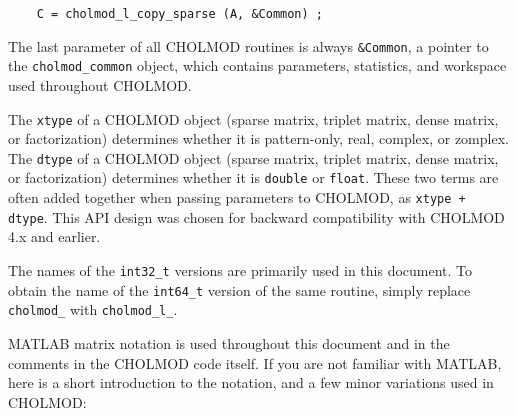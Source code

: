 \documentclass[11pt]{article}
\begin{document}
\begin{verbatim}
    C = cholmod_l_copy_sparse (A, &Common) ;
\end{verbatim}

The last parameter of all CHOLMOD routines is always {\tt \&Common}, a pointer
to the {\tt cholmod\_common} object, which contains parameters, statistics, and
workspace used throughout CHOLMOD.

The {\tt xtype} of a CHOLMOD object (sparse matrix, triplet matrix, dense
matrix, or factorization) determines whether it is pattern-only, real, complex,
or zomplex.  The {\tt dtype} of a CHOLMOD object (sparse matrix, triplet
matrix, dense matrix, or factorization) determines whether it is {\tt double}
or {\tt float}.  These two terms are often added together when passing
parameters to CHOLMOD, as {\tt xtype + dtype}.  This API design was chosen
for backward compatibility with CHOLMOD 4.x and earlier.

The names of the {\tt int32\_t} versions are primarily used in this document.  To
obtain the name of the {\tt int64\_t} version of the same routine, simply
replace {\tt cholmod\_} with {\tt cholmod\_l\_}.

MATLAB matrix notation is used throughout this document and in the comments in
the CHOLMOD code itself.  If you are not familiar with MATLAB, here is a short
introduction to the notation, and a few minor variations used in CHOLMOD:
\end{document}
